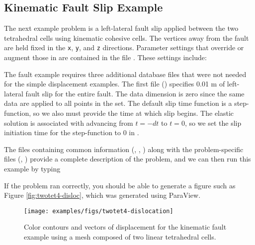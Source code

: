 \subsection{Kinematic Fault Slip Example}

The next example problem is a left-lateral fault slip applied between
the two tetrahedral cells using kinematic cohesive cells. The vertices
away from the fault are held fixed in the \texttt{x}, \texttt{y},
and \texttt{z} directions. Parameter settings that override or augment
those in  are contained in the file .
These settings include:
\begin{inventory}
\end{inventory}
The fault example requires three additional database files that were
not needed for the simple displacement examples. The first file
() specifies 0.01 m of
left-lateral fault slip for the entire fault.  The data dimension is
zero since the same data are applied to all points in the set. The
default slip time function is a step-function, so we also must provide
the time at which slip begins. The elastic solution is associated with
advancing from $t=-dt$ to $t=0$, so we set the slip initiation time
for the step-function to 0 in
.

The files containing common information (, ,
) along with the problem-specific files
(,
) provide a complete description
of the problem, and we can then run this example by typing
If the problem ran correctly, you should be able to generate a figure
such as Figure \vref{fig:twotet4-disloc}, which was generated using
ParaView.

\begin{figure}
  \texttt{[image: examples/figs/twotet4-dislocation]}
  \caption{Color contours and vectors of displacement for the kinematic fault
    example using a mesh composed of two linear tetrahedral cells.}
  \label{fig:twotet4-disloc}
\end{figure}


